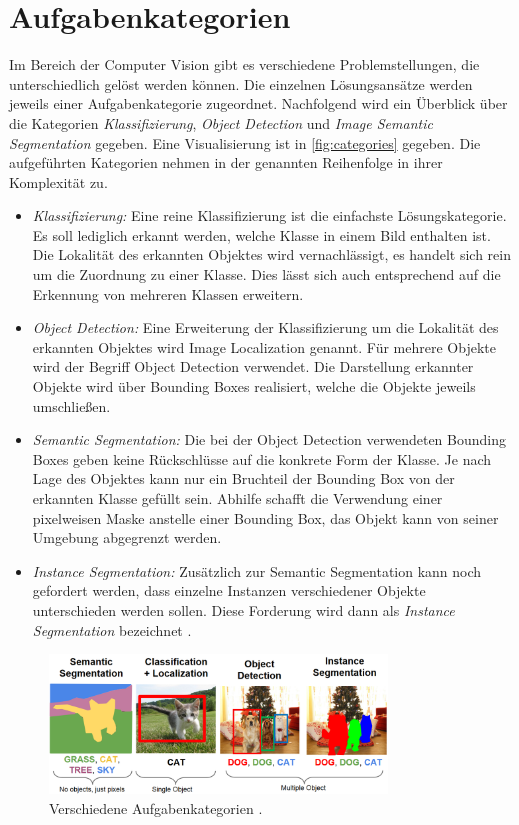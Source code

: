 \section{Aufgabenkategorien} \label{sec:aufgabenkategorien}
Im Bereich der Computer Vision gibt es verschiedene Problemstellungen, die unterschiedlich gelöst werden können.
Die einzelnen Lösungsansätze werden jeweils einer Aufgabenkategorie zugeordnet.
Nachfolgend wird ein Überblick über die Kategorien \textit{Klassifizierung}, \textit{Object Detection} und \textit{Image Semantic Segmentation} gegeben.
Eine Visualisierung ist in \autoref{fig:categories} gegeben.
Die aufgeführten Kategorien nehmen in der genannten Reihenfolge in ihrer Komplexität zu.

\begin{itemize}
	\item \textit{Klassifizierung:}
	Eine reine Klassifizierung ist die einfachste Lösungskategorie. 
	Es soll lediglich erkannt werden, welche Klasse in einem Bild enthalten ist.
	Die Lokalität des erkannten Objektes wird vernachlässigt, es handelt sich rein um die Zuordnung zu einer Klasse.
	Dies lässt sich auch entsprechend auf die Erkennung von mehreren Klassen erweitern.
	
	\item \textit{Object Detection:}
	Eine Erweiterung der Klassifizierung um die Lokalität des erkannten Objektes wird Image Localization genannt.
	Für mehrere Objekte wird der Begriff Object Detection verwendet.
	Die Darstellung erkannter Objekte wird über Bounding Boxes realisiert, welche die Objekte jeweils umschließen.

	\item \textit{Semantic Segmentation:}
	Die bei der Object Detection verwendeten Bounding Boxes geben keine Rückschlüsse auf die konkrete Form der Klasse.
	Je nach Lage des Objektes kann nur ein Bruchteil der Bounding Box von der erkannten Klasse gefüllt sein.
	Abhilfe schafft die Verwendung einer pixelweisen Maske anstelle einer Bounding Box, das Objekt kann von seiner Umgebung abgegrenzt werden.

	\item \textit{Instance Segmentation:}
	Zusätzlich zur Semantic Segmentation kann noch gefordert werden, dass einzelne Instanzen verschiedener Objekte 
	unterschieden werden sollen.
	Diese Forderung wird dann als \textit{Instance Segmentation} bezeichnet \cite{Sharma.21.08.2019}.
\end{itemize}

\begin{figure}
	\centering
	\includegraphics[width=0.8\textwidth]{Bilder/categories.png} 
	\caption{Verschiedene Aufgabenkategorien \cite{.10.11.2022}.}
	\label{fig:categories}
\end{figure} 

